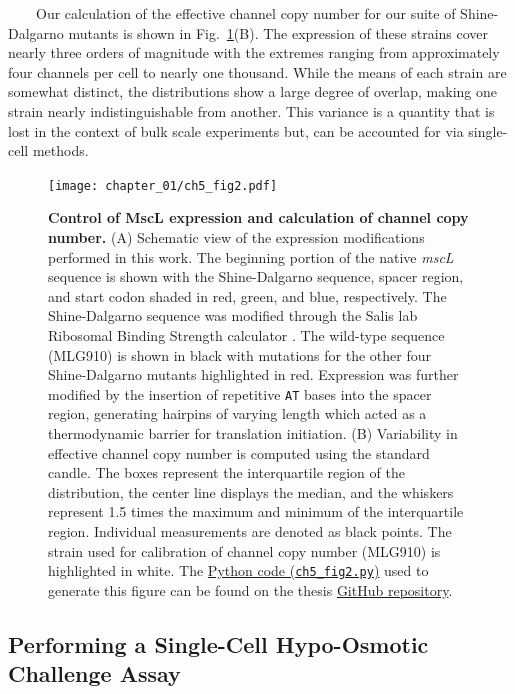 \documentclass[12pt]{caltech_thesis}
\begin{document}
~~~~Our calculation of the effective channel copy number for our suite
of Shine-Dalgarno mutants is shown in Fig.~\ref{fig:mscl_boxplot}(B).
The expression of these strains cover nearly three orders of magnitude
with the extremes ranging from approximately four channels per cell to
nearly one thousand. While the means of each strain are somewhat
distinct, the distributions show a large degree of overlap, making one
strain nearly indistinguishable from another. This variance is a
quantity that is lost in the context of bulk scale experiments but, can
be accounted for via single-cell methods.

\hypertarget{fig:mscl_boxplot}{%
\begin{figure}
\centering
\texttt{[image: chapter\_01/ch5\_fig2.pdf]}
\caption[{Control of MscL expression and calculation of channel copy
number.}]{\textbf{Control of MscL expression and calculation of channel
copy number.} (A) Schematic view of the expression modifications
performed in this work. The beginning portion of the native \emph{mscL}
sequence is shown with the Shine-Dalgarno sequence, spacer region, and
start codon shaded in red, green, and blue, respectively. The
Shine-Dalgarno sequence was modified through the Salis lab Ribosomal
Binding Strength calculator \autocite{espahborujeni2014,salis2009a}. The
wild-type sequence (MLG910) is shown in black with mutations for the
other four Shine-Dalgarno mutants highlighted in red. Expression was
further modified by the insertion of repetitive \texttt{AT} bases into
the spacer region, generating hairpins of varying length which acted as
a thermodynamic barrier for translation initiation. (B) Variability in
effective channel copy number is computed using the standard candle. The
boxes represent the interquartile region of the distribution, the center
line displays the median, and the whiskers represent 1.5 times the
maximum and minimum of the interquartile region. Individual measurements
are denoted as black points. The strain used for calibration of channel
copy number (MLG910) is highlighted in white. The
\href{https://github.com/gchure/phd/blob/master/src/chapter_05/code/ch5_fig2.py}{Python
code (\texttt{ch5\_fig2.py})} used to generate this figure can be found
on the thesis \href{https://github.com/gchure/phd}{GitHub repository}.}
\label{fig:mscl_boxplot}
\end{figure}
}

\hypertarget{performing-a-single-cell-hypo-osmotic-challenge-assay}{%
\subsection{Performing a Single-Cell Hypo-Osmotic Challenge
Assay}\label{performing-a-single-cell-hypo-osmotic-challenge-assay}}
\end{document}
